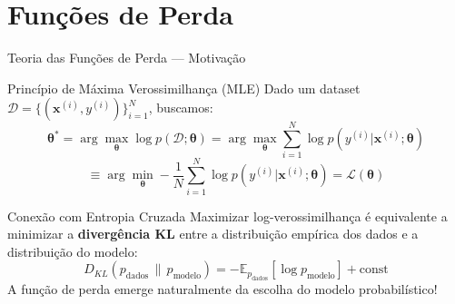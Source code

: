 \documentclass[7pt, aspectratio=169,10pt]{beamer}
\newcommand{\bx}{\bm{x}}
\newcommand{\btheta}{\bm{\theta}}
\newcommand{\E}{\mathbb{E}}
\begin{document}
\section{Funções de Perda}

\begin{frame}{Teoria das Funções de Perda — Motivação}
\begin{block}{Princípio de Máxima Verossimilhança (MLE)}
\small
Dado um dataset $\mathcal{D}=\{(\bx^{(i)},y^{(i)})\}_{i=1}^N$, buscamos:
\[
\btheta^* = \arg\max_{\btheta} \log p(\mathcal{D};\btheta)
= \arg\max_{\btheta} \sum_{i=1}^N \log p(y^{(i)}|\bx^{(i)};\btheta)
\]
\[
\equiv \arg\min_{\btheta} -\frac{1}{N}\sum_{i=1}^N \log p(y^{(i)}|\bx^{(i)};\btheta) = \mathcal{L}(\btheta)
\]
\end{block}
\vspace{4pt}
\begin{exampleblock}{Conexão com Entropia Cruzada}
\small
Maximizar log-verossimilhança é equivalente a minimizar a \textbf{divergência KL} entre a distribuição empírica dos dados e a distribuição do modelo:
\[
D_{KL}(p_{\text{dados}}\,\|\,p_{\text{modelo}}) = -\E_{p_{\text{dados}}}[\log p_{\text{modelo}}] + \text{const}
\]
A função de perda emerge naturalmente da escolha do modelo probabilístico!
\end{exampleblock}
\end{frame}
\end{document}
